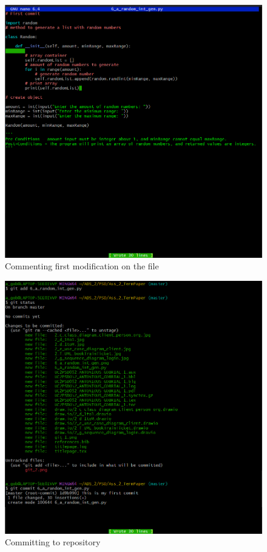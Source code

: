 \documentclass{article}
\begin{document}
\begin{figure}[ht]
 	\centering
 	\includegraphics[width=\textwidth]{git_2.png}
 	\caption{Commenting first modification on the file}
 	\label{fig:git_2}
\end{figure}
 \begin{figure}[ht]
	\centering
	\includegraphics[width=\textwidth]{git_3.png}
	\caption{Committing to repository}
	\label{fig:git_3}
\end{figure}
\end{document}
